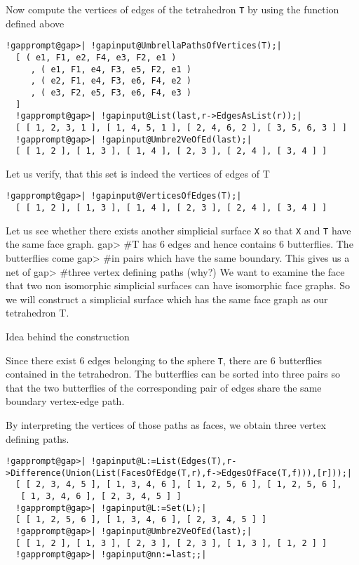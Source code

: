 \documentclass[a4paper,11pt]{report}
\begin{document}
{{{ Now compute the vertices of edges of the tetrahedron \texttt{T} by using the function defined above 

 
\begin{Verbatim}[commandchars=!@|,fontsize=\small,frame=single,label=Example]
  !gapprompt@gap>| !gapinput@UmbrellaPathsOfVertices(T);|
  [ ( e1, F1, e2, F4, e3, F2, e1 )
     , ( e1, F1, e4, F3, e5, F2, e1 )
     , ( e2, F1, e4, F3, e6, F4, e2 )
     , ( e3, F2, e5, F3, e6, F4, e3 )
  ]
  !gapprompt@gap>| !gapinput@List(last,r->EdgesAsList(r));|
  [ [ 1, 2, 3, 1 ], [ 1, 4, 5, 1 ], [ 2, 4, 6, 2 ], [ 3, 5, 6, 3 ] ]
  !gapprompt@gap>| !gapinput@Umbre2VeOfEd(last);|
  [ [ 1, 2 ], [ 1, 3 ], [ 1, 4 ], [ 2, 3 ], [ 2, 4 ], [ 3, 4 ] ]
\end{Verbatim}
 

 Let us verify, that this set is indeed the vertices of edges of T 

 
\begin{Verbatim}[commandchars=!@|,fontsize=\small,frame=single,label=Example]
  !gapprompt@gap>| !gapinput@VerticesOfEdges(T);|
  [ [ 1, 2 ], [ 1, 3 ], [ 1, 4 ], [ 2, 3 ], [ 2, 4 ], [ 3, 4 ] ]
\end{Verbatim}
 Let us see whether there exists another simplicial surface \texttt{X} so that \texttt{X} and \texttt{T} have the same face graph. gap{\textgreater} \#T has 6 edges and hence contains
6 butterflies. The butterflies come gap{\textgreater} \#in pairs which have
the same boundary. This gives us a net of gap{\textgreater} \#three vertex
defining paths (why?) We want to examine the face that two non isomorphic
simplicial surfaces can have isomorphic face graphs. So we will construct a
simplicial surface which has the same face graph as our tetrahedron T. 

 Idea behind the construction 

 Since there exist 6 edges belonging to the sphere \texttt{T}, there are 6 butterflies contained in the tetrahedron. The butterflies can be
sorted into three pairs so that the two butterflies of the corresponding pair
of edges share the same boundary vertex-edge path. 

 
\begin{center}

\end{center}
 

 By interpreting the vertices of those paths as faces, we obtain three vertex
defining paths. 

 
\begin{Verbatim}[commandchars=!@|,fontsize=\small,frame=single,label=Example]
  !gapprompt@gap>| !gapinput@L:=List(Edges(T),r->Difference(Union(List(FacesOfEdge(T,r),f->EdgesOfFace(T,f))),[r]));|
  [ [ 2, 3, 4, 5 ], [ 1, 3, 4, 6 ], [ 1, 2, 5, 6 ], [ 1, 2, 5, 6 ], 
   [ 1, 3, 4, 6 ], [ 2, 3, 4, 5 ] ]
  !gapprompt@gap>| !gapinput@L:=Set(L);|
  [ [ 1, 2, 5, 6 ], [ 1, 3, 4, 6 ], [ 2, 3, 4, 5 ] ]
  !gapprompt@gap>| !gapinput@Umbre2VeOfEd(last);|
  [ [ 1, 2 ], [ 1, 3 ], [ 2, 3 ], [ 2, 3 ], [ 1, 3 ], [ 1, 2 ] ]
  !gapprompt@gap>| !gapinput@nn:=last;;|
\end{Verbatim}
 

}}}
\end{document}
